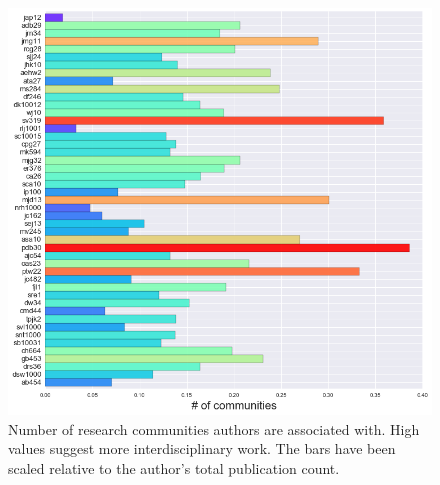 \section{}
\begin{center}
\begin{figure}[H]
\label{fig:LABELLEDDENDRO}
  \centering
    \includegraphics[scale=0.8]{Analysis/community_detection2.png}
    \caption{Number of research communities authors are associated with. High values suggest more interdisciplinary work. The bars have been scaled relative to the author's total publication count. }
\end{figure} 
\end{center}